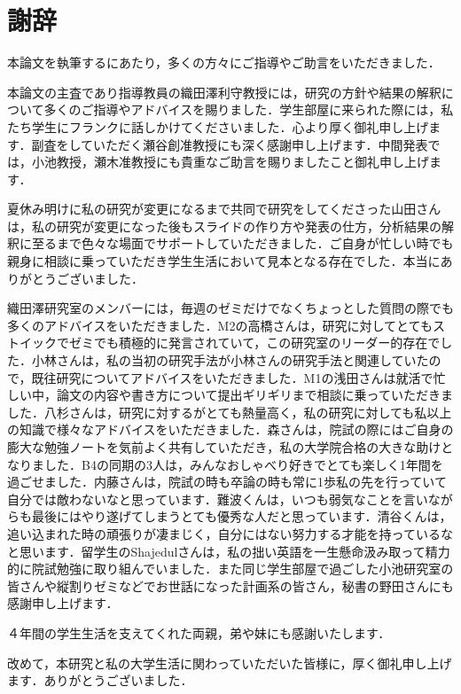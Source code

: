 \chapter*{謝辞}

本論文を執筆するにあたり，多くの方々にご指導やご助言をいただきました．

本論文の主査であり指導教員の織田澤利守教授には，研究の方針や結果の解釈について多くのご指導やアドバイスを賜りました．学生部屋に来られた際には，私たち学生にフランクに話しかけてくださいました．心より厚く御礼申し上げます．副査をしていただく瀬谷創准教授にも深く感謝申し上げます．中間発表では，小池教授，瀬木准教授にも貴重なご助言を賜りましたこと御礼申し上げます．

夏休み明けに私の研究が変更になるまで共同で研究をしてくださった山田さんは，私の研究が変更になった後もスライドの作り方や発表の仕方，分析結果の解釈に至るまで色々な場面でサポートしていただきました．ご自身が忙しい時でも親身に相談に乗っていただき学生生活において見本となる存在でした．本当にありがとうございました．

織田澤研究室のメンバーには，毎週のゼミだけでなくちょっとした質問の際でも多くのアドバイスをいただきました．M2の高橋さんは，研究に対してとてもストイックでゼミでも積極的に発言されていて，この研究室のリーダー的存在でした．小林さんは，私の当初の研究手法が小林さんの研究手法と関連していたので，既往研究についてアドバイスをいただきました．M1の浅田さんは就活で忙しい中，論文の内容や書き方について提出ギリギリまで相談に乗っていただきました．八杉さんは，研究に対するがとても熱量高く，私の研究に対しても私以上の知識で様々なアドバイスをいただきました．森さんは，院試の際にはご自身の膨大な勉強ノートを気前よく共有していただき，私の大学院合格の大きな助けとなりました．B4の同期の3人は，みんなおしゃべり好きでとても楽しく1年間を過ごせました．内藤さんは，院試の時も卒論の時も常に1歩私の先を行っていて自分では敵わないなと思っています．難波くんは，いつも弱気なことを言いながらも最後にはやり遂げてしまうとても優秀な人だと思っています．清谷くんは，追い込まれた時の頑張りが凄まじく，自分にはない努力する才能を持っているなと思います．留学生のShajedulさんは，私の拙い英語を一生懸命汲み取って精力的に院試勉強に取り組んでいました．また同じ学生部屋で過ごした小池研究室の皆さんや縦割りゼミなどでお世話になった計画系の皆さん，秘書の野田さんにも感謝申し上げます．

４年間の学生生活を支えてくれた両親，弟や妹にも感謝いたします．

改めて，本研究と私の大学生活に関わっていただいた皆様に，厚く御礼申し上げます．ありがとうございました．